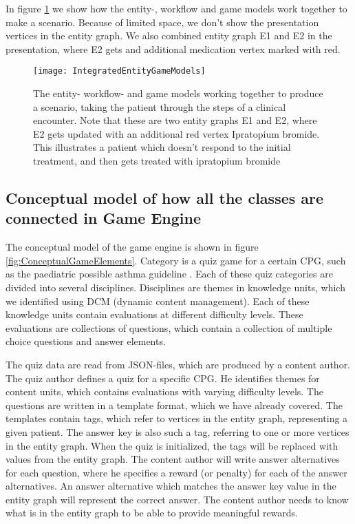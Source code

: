 In figure \ref{fig:IntegratedEntityGamelModels} we show how the entity-, workflow and game models work together to make a scenario. Because of limited space, we don't show the presentation vertices in the entity graph. We also combined entity graph E1 and E2 in the presentation, where E2 gets and additional medication vertex marked with red. 
\begin{figure}[h!]
	\caption {The entity- workflow- and game models working together to produce a scenario, taking the patient through the steps of a clinical encounter. Note that these are two entity graphs E1 and E2, where E2 gets updated with an additional red vertex Ipratopium bromide. This illustrates a patient which doesn't respond to the initial treatment, and then gets treated with ipratopium bromide}
	\label{fig:IntegratedEntityGamelModels}
	\texttt{[image: IntegratedEntityGameModels]}
\end{figure}

\subsection{Conceptual model of how all the classes are connected in Game Engine}
The conceptual model of the game engine is shown in figure \ref{fig:ConceptualGameElements}. Category is a quiz game for a certain CPG, such as the paediatric possible asthma guideline \parencite{RepublicofKeny2016}. Each of these quiz categories are divided into several disciplines. Disciplines are themes in knowledge units, which we identified using DCM (dynamic content management). Each of these knowledge units contain evaluations at different difficulty levels. These evaluations are collections of questions, which contain a collection of multiple choice questions and answer elements.

The quiz data are read from JSON-files, which are produced by a content author. The quiz author defines a quiz for a specific CPG. He identifies themes for content units, which contains evaluations with varying difficulty levels. The questions are written in a template format, which we have already covered. The templates contain tags, which refer to vertices in the entity graph, representing a given patient. The answer key is also such a tag, referring to one or more vertices in the entity graph. When the quiz is initialized, the tags will be replaced with values from the entity graph. The content author will write answer alternatives for each question, where he specifies a reward (or penalty) for each of the answer alternatives. An answer alternative which matches the answer key value in the entity graph will represent the correct answer. The content author needs to know what is in the entity graph to be able to provide meaningful rewards.

